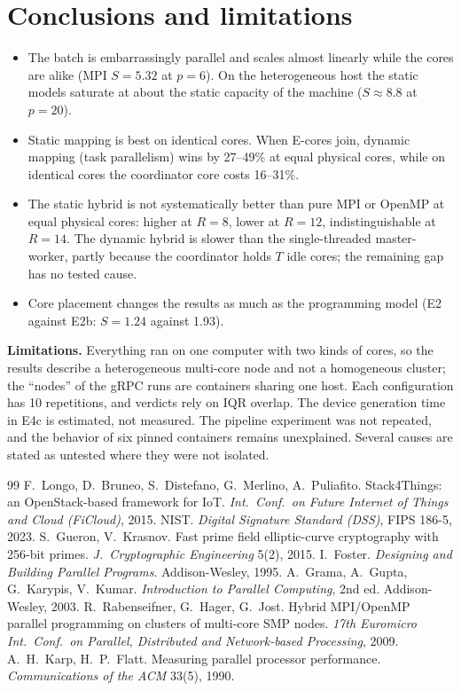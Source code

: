 \documentclass[10pt,a4paper]{article}
\begin{document}
\section{Conclusions and limitations}

\begin{itemize}
  \item The batch is embarrassingly parallel and scales almost linearly while the cores are alike (MPI $S=5.32$ at $p=6$). On the heterogeneous host the static models saturate at about the static capacity of the machine ($S\approx8.8$ at $p=20$).
  \item Static mapping is best on identical cores. When E-cores join, dynamic mapping (task parallelism) wins by 27--49\% at equal physical cores, while on identical cores the coordinator core costs 16--31\%.
  \item The static hybrid is not systematically better than pure MPI or OpenMP at equal physical cores: higher at $R=8$, lower at $R=12$, indistinguishable at $R=14$. The dynamic hybrid is slower than the single-threaded master-worker, partly because the coordinator holds $T$ idle cores; the remaining gap has no tested cause.
  \item Core placement changes the results as much as the programming model (E2 against E2b: $S=1.24$ against 1.93).
\end{itemize}

\textbf{Limitations.} Everything ran on one computer with two kinds of cores, so the results describe a heterogeneous multi-core node and not a homogeneous cluster; the ``nodes'' of the gRPC runs are containers sharing one host. Each configuration has 10 repetitions, and verdicts rely on IQR overlap. The device generation time in E4c is estimated, not measured. The pipeline experiment was not repeated, and the behavior of six pinned containers remains unexplained. Several causes are stated as untested where they were not isolated.

\begin{thebibliography}{99}\small
{} F.~Longo, D.~Bruneo, S.~Distefano, G.~Merlino, A.~Puliafito. Stack4Things: an OpenStack-based framework for IoT. \emph{Int.\ Conf.\ on Future Internet of Things and Cloud (FiCloud)}, 2015.
 NIST. \emph{Digital Signature Standard (DSS)}, FIPS 186-5, 2023.
 S.~Gueron, V.~Krasnov. Fast prime field elliptic-curve cryptography with 256-bit primes. \emph{J.\ Cryptographic Engineering} 5(2), 2015.
 I.~Foster. \emph{Designing and Building Parallel Programs}. Addison-Wesley, 1995.
 A.~Grama, A.~Gupta, G.~Karypis, V.~Kumar. \emph{Introduction to Parallel Computing}, 2nd ed. Addison-Wesley, 2003.
 R.~Rabenseifner, G.~Hager, G.~Jost. Hybrid MPI/OpenMP parallel programming on clusters of multi-core SMP nodes. \emph{17th Euromicro Int.\ Conf.\ on Parallel, Distributed and Network-based Processing}, 2009.
 A.~H.~Karp, H.~P.~Flatt. Measuring parallel processor performance. \emph{Communications of the ACM} 33(5), 1990.
\end{thebibliography}
\end{document}
